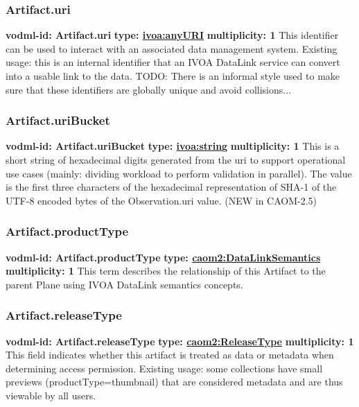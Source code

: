     \subsubsection{Artifact.uri}
      \textbf{vodml-id: Artifact.uri} \newline
      \textbf{type: \hyperref[sect:ivoa]{ivoa:anyURI}} \newline
      \textbf{multiplicity: 1} \newline
      This identifier can be used to interact with an associated data management system. Existing usage: this is an internal identifier that an IVOA DataLink service can convert into a usable link to the data. TODO: There is an informal style used to make sure that these identifiers are globally unique and avoid collisions...

    \subsubsection{Artifact.uriBucket}
      \textbf{vodml-id: Artifact.uriBucket} \newline
      \textbf{type: \hyperref[sect:ivoa]{ivoa:string}} \newline
      \textbf{multiplicity: 1} \newline
      This is a short string of hexadecimal digits generated from the uri to support operational use cases (mainly: dividing workload to perform validation in parallel). The value is the first three characters of the hexadecimal representation of SHA-1 of the UTF-8 encoded bytes of the Observation.uri value. (NEW in CAOM-2.5)

    \subsubsection{Artifact.productType}
      \textbf{vodml-id: Artifact.productType} \newline
      \textbf{type: \hyperref[sect:DataLinkSemantics]{caom2:DataLinkSemantics}} \newline
      \textbf{multiplicity: 1} \newline
      This term describes the relationship of this Artifact to the parent Plane using IVOA DataLink semantics concepts.

    \subsubsection{Artifact.releaseType}
      \textbf{vodml-id: Artifact.releaseType} \newline
      \textbf{type: \hyperref[sect:ReleaseType]{caom2:ReleaseType}} \newline
      \textbf{multiplicity: 1} \newline
      This field indicates whether this artifact is treated as data or metadata when determining access permission. Existing usage: some collections have small previews (productType=thumbnail) that are considered metadata and are thus viewable by all users.

